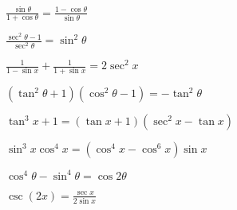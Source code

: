 \documentclass{exam}
\begin{document}
\begin{questions}
    \begin{minipage}{.45\linewidth}
        \question $\displaystyle\frac{\sin\theta}{1+\cos\theta}=\frac{1-\cos\theta}{\sin\theta}$    
    \end{minipage}
    \hfill
    \begin{minipage}{.45\linewidth}
        \question $\displaystyle\frac{\sec^2\theta-1}{\sec^2\theta}=\sin^2\theta$    
    \end{minipage}


    \newpage

    \begin{minipage}{.45\linewidth}
        \question $\displaystyle\frac{1}{1-\sin x}+\frac{1}{1+\sin x}=2\sec^2 x$    
    \end{minipage}
    \hfill
    \begin{minipage}{.45\linewidth}
        \question $\displaystyle\left(\tan^2\theta+1\right)\left(\cos^2\theta-1\right)=-\tan^2 \theta$    
    \end{minipage}
    

    \begin{minipage}{.45\linewidth}
        \question $\displaystyle\tan^3 x+1=(\tan x+1)(\sec^2 x-\tan x)$    
    \end{minipage}
    \hfill
    \begin{minipage}{.45\linewidth}
        \question $\displaystyle\sin^3 x\cos^4 x=\left(\cos^4 x-\cos^6 x\right)\sin x$    
    \end{minipage}
    

    \begin{minipage}{.45\linewidth}
        \question $\displaystyle\cos^ 4\theta-\sin^4 \theta=\cos2\theta$    
    \end{minipage}
    \hfill
    \begin{minipage}{.45\linewidth}
        \question $\displaystyle\csc(2x)=\frac{\sec x}{2\sin x}$    
    \end{minipage}
    
\end{questions}

\newpage
\end{document}
